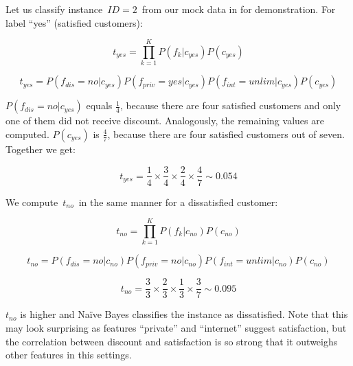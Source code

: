 Let us classify instance~$\mathit{ID}=2$~from our mock data in  for demonstration.
For label ``yes'' (satisfied customers):

\begin{equation}
	t_{yes} = 
	\prod_{k=1}^{K}
	{P\left(  f_k  | c_{yes} \right)}
	P\left( c_{yes} \right)
\end{equation}

\begin{equation}
	t_{yes} = 
	P\left(  f_{dis} = no | c_{yes} \right)
	P\left(  f_{priv} = yes | c_{yes} \right)
	P\left(  f_{int} = unlim | c_{yes} \right)
	P\left( c_{yes} \right)
\end{equation}

$P\left(  f_{dis} = no | c_{yes} \right)$ equals $\frac{1}{4}$, because there are four satisfied customers
and only one of them did not receive discount.
Analogously, the remaining values are computed.
$P\left( c_{yes} \right)$ is $\frac{4}{7}$, because there are four satisfied customers out of seven.
Together we get:

\begin{equation}
	t_{yes} = 
	\frac{1}{4} \times
	\frac{3}{4} \times
	\frac{2}{4} \times
	\frac{4}{7}
	\sim 0.054
\end{equation}

We compute~$t_{no}$~in the same manner for a dissatisfied customer:

\begin{equation}
	t_{no} = 
	\prod_{k=1}^{K}
	{P\left(  f_k  | c_{no} \right)}
	P\left( c_{no} \right)
\end{equation}

\begin{equation}
	t_{no} = 
	P\left(  f_{dis} = no | c_{no} \right)
	P\left(  f_{priv} = no | c_{no} \right)
	P\left(  f_{int} = unlim | c_{no} \right)
	P\left( c_{no} \right)
\end{equation}

\begin{equation}
	t_{no} = 
	\frac{3}{3} \times
	\frac{2}{3} \times
	\frac{1}{3} \times
	\frac{3}{7}
	\sim 0.095
\end{equation}

$t_{no}$ is higher and Na\"{i}ve Bayes classifies the instance as dissatisfied.
Note that this may look surprising as features ``private'' and ``internet'' suggest satisfaction,
but the correlation between discount and satisfaction is so strong that it outweighs other features in this settings.


